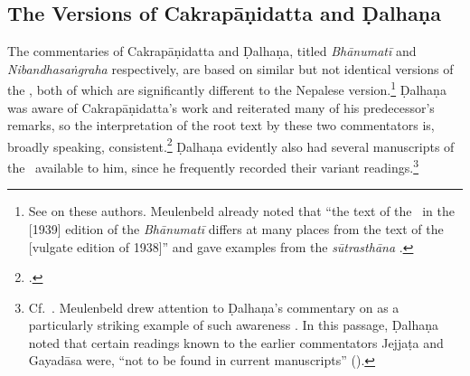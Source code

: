 \subsection{The Versions of Cakrapāṇidatta and Ḍalhaṇa}

The commentaries of Cakrapāṇidatta and Ḍalhaṇa, titled \emph{Bhānumatī} and
\emph{Nibandhasaṅgraha} respectively, are based on similar but not identical
versions of the \SS, both of which are significantly different to the Nepalese
version.\footnote{See \cite[IA 374--379]{meul-hist} on these authors. Meulenbeld
already noted that “the text of the \SS\ in the [1939] edition of the
\emph{Bhānumatī} differs at many places from the text of the [vulgate edition of
1938]” and gave examples from the \emph{sūtrasthāna} \citep[IB, 496, note
76]{meul-hist}.} Ḍalhaṇa was aware of Cakrapāṇidatta's work and reiterated many of
his predecessor's remarks, so the interpretation of the root text by these two
commentators is, broadly speaking, consistent.\footcite[IB, 499,
n.\,162]{meul-hist}  Ḍalhaṇa evidently also had several manuscripts of the \SS\
available to him, since he frequently recorded their variant
readings.\footnote{Cf.\ \cite[IA, 377]{meul-hist}.  Meulenbeld drew attention to
Ḍalhaṇa's commentary on \Su{5.8.24cd--25ab}{587} as a particularly striking
example of such awareness \citep[IB, 497, n.\,112]{meul-hist}.  In this passage, Ḍalhaṇa
noted that certain readings known to the earlier commentators Jejjaṭa and Gayadāsa
were, “not to be found in current manuscripts” 
().}

